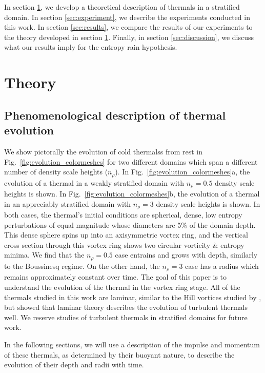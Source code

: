 \documentclass[twocolumn, amsmath, amsfonts, amssymb, trackchanges]{aastex62}
\begin{document}
In section \ref{sec:theory}, we develop a theoretical description of thermals in a stratified domain. 
In section \ref{sec:experiment}, we describe the experiments conducted in this work. 
In section \ref{sec:results}, we compare the results of our experiments to the theory developed in section \ref{sec:theory}. 
Finally, in section \ref{sec:discussion}, we discuss what our results imply for the entropy rain hypothesis.

\section{Theory}
\label{sec:theory}

\subsection{Phenomenological description of thermal evolution}
We show pictorally the evolution of cold thermalss from rest in Fig.~\ref{fig:evolution_colormeshes} for two different domains which span a different number of density scale heights ($n_\rho$). 
In Fig.~\ref{fig:evolution_colormeshes}a, the evolution of a thermal in a weakly stratified domain with $n_\rho = 0.5$ density scale heights is shown. 
In Fig.~\ref{fig:evolution_colormeshes}b, the evolution of a thermal in an appreciably stratified domain with $n_\rho = 3$ density scale heights is shown. 
In both cases, the thermal's initial conditions are spherical, dense, low entropy perturbations of equal magnitude whose diameters are 5\% of the domain depth.
This dense sphere spins up into an axisymmetric vortex ring, and the vertical cross section through this vortex ring shows two circular vorticity \& entropy minima.
We find that the $n_\rho = 0.5$ case entrains and grows with depth, similarly to the Boussinesq regime.
On the other hand, the $n_\rho = 3$ case has a radius which remains approximately constant over time.
The goal of this paper is to understand the evolution of the thermal in the vortex ring stage.
All of the thermals studied in this work are laminar, similar to the Hill vortices studied by \citet{brandenburg2016}, but \citet{lecoanet&jeevanjee2018} showed that laminar theory describes the evolution of turbulent thermals well.
We reserve studies of turbulent thermals in stratified domains for future work.

In the following sections, we will use a description of the impulse and momentum of these thermals, as determined by their buoyant nature, to describe the evolution of their depth and radii with time.
\end{document}
